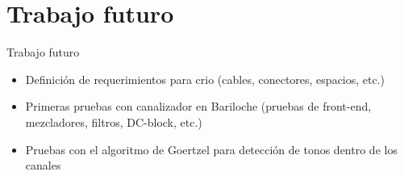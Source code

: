 \documentclass[ignorenonframetext,12pt]{beamer}
\begin{document}
\section{Trabajo futuro}
\begin{frame}{Trabajo futuro}
				\begin{itemize}
								\item Definici\'on de requerimientos para crio (cables,
												conectores, espacios, etc.)
								\item Primeras pruebas con canalizador en Bariloche (pruebas de
												front-end, mezcladores, filtros, DC-block, etc.)
								\item Pruebas con el algoritmo de Goertzel para detección de
												tonos dentro de los canales
				\end{itemize}
\end{frame}
%
%
%
%
%
%
%
%
%
%
%
%
%
\end{document}

